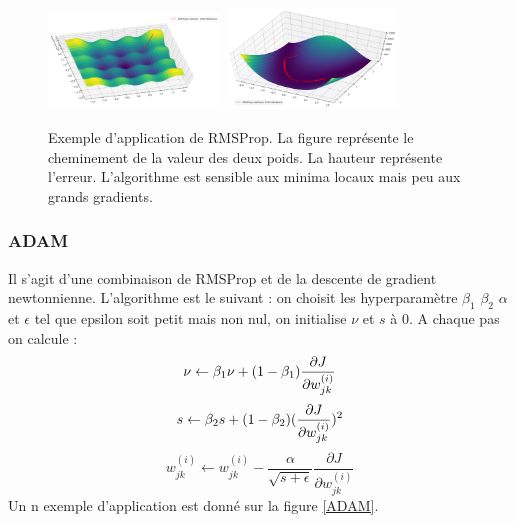 \begin{figure}[!h]
\centering
\includegraphics[width=130pt]{"images/MLP/RMSProp"}
\hspace*{10mm}
\includegraphics[width=130pt]{"images/MLP/RMSPropPropre"}
\caption{Exemple d'application de RMSProp. La figure représente le cheminement de la valeur des deux poids. La hauteur représente l'erreur. L'algorithme est sensible aux minima locaux mais peu aux grands gradients.}
\label{RMSProp}
\end{figure}

\subsubsection{ADAM}
Il s'agit d'une combinaison de RMSProp et de la descente de gradient newtonnienne.
L'algorithme est le suivant : on choisit les hyperparamètre $\beta_1$ $\beta_2$  $\alpha$ et $\epsilon$ tel que epsilon soit petit mais non nul, on initialise $\nu$ et $s$ à 0.
A chaque pas on calcule :
\begin{displaymath}
\nu \leftarrow \beta_1 \nu + (1-\beta_1) \frac{\partial J}{\partial w_{jk}^{(i)}} \\
\end{displaymath}
\begin{displaymath}
s \leftarrow \beta_2 s + (1-\beta_2) (\frac{\partial J}{\partial w_{jk}^{(i)}})^2 \\
\end{displaymath}
\begin{displaymath}
w_{jk}^{(i)} \leftarrow w_{jk}^{(i)} - \frac{\alpha}{\sqrt{s+\epsilon}}\frac{\partial J}{\partial w_{jk}^{(i)}}
\end{displaymath}
Un n exemple d'application est donné sur la figure \ref{ADAM}.

